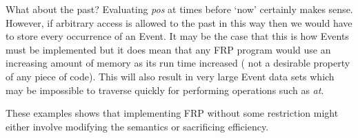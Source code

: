      What about the past? Evaluating \emph{pos} at times before `now' certainly makes sense. However, if arbitrary
      access is allowed to the past in this way then we would have to store every occurrence
      of an Event. It may be the case that this is how Events must be implemented but it does
      mean that any FRP program would use an increasing amount of memory as its run time increased (
      not a desirable property of any piece of code). This will also result in very large Event data sets which
      may be impossible to traverse quickly for performing operations such as \emph{at}.
      
      These examples shows that implementing FRP without some restriction might either involve modifying the
      semantics or sacrificing efficiency.
